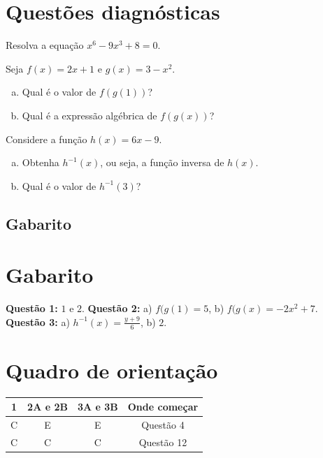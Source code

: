 \documentclass[main.tex]{subfiles}
\begin{document}
\newpage

\paraAmbos

\section{Questões diagnósticas}

\begin{diagnostico}
Resolva a equação $x^6-9x^3+8=0$.
\end{diagnostico}

\begin{diagnostico}
Seja $f(x)=2x+1$ e $g(x)=3-x^2$.
\begin{enumerate}[a)]
  \item Qual é o valor de $f(g(1))$?
  \item Qual é a expressão algébrica de $f(g(x))$?
\end{enumerate}
\end{diagnostico}

\begin{diagnostico}
Considere a função $h(x)=6x-9$.
\begin{enumerate}[a)]
  \item Obtenha $h^{-1}(x)$, ou seja, a função inversa de $h(x)$.
  \item Qual é o valor de $h^{-1}(3)$?
\end{enumerate}
\end{diagnostico}

\paraTutores
\subsection{Gabarito}

\section{Gabarito}

\textbf{Questão 1:} $1$ e $2$. \textbf{Questão 2:} a) $f(g(1)=5$, b) $f(g(x)=-2x^2+7$. \textbf{Questão 3:} a) $h^{-1}(x)=\frac{y+9}{6}$, b) $2$.

\section{Quadro de orientação}

\begin{center}
 \begin{tabular}{|c c c |c|} 
 \hline
 1 & 2A e 2B & 3A e 3B & Onde começar\\
 \hline
 C & E & E & Questão 4 \\ 
 \hline
 C & C & C & Questão 12 \\ 
 \hline
\end{tabular}
\end{center}
\end{document}
